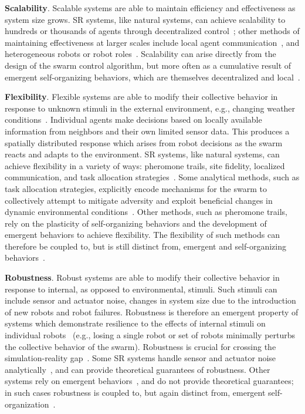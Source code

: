 \textbf{Scalability}. Scalable systems are able to maintain efficiency and
effectiveness as system size grows. SR systems, like natural systems, can
achieve scalability to hundreds or thousands of agents through decentralized
control~\cite{Matthey2009}; other methods of maintaining effectiveness at larger
scales include local agent communication~\cite{Agassounon2001,Lerman2006}, and
heterogeneous robots or robot roles~\cite{Lu2020,Harwell2019a}.  Scalability
can arise directly from the design of the swarm control algorithm, but more
often as a cumulative result of emergent self-organizing behaviors, which
are themselves decentralized and local~\cite{DeWolf2005}.

\textbf{Flexibility}. Flexible systems are able to modify their collective
behavior in response to unknown stimuli in the external environment, e.g.,
changing weather conditions~\cite{Harwell2019a,Just2017,Hunt2020}. Individual
agents make decisions based on locally available information from neighbors and
their own limited sensor data. This produces a spatially distributed response
which arises from robot decisions as the swarm reacts and adapts to the
environment. SR systems, like natural systems, can achieve flexibility in a
variety of ways: pheromone trails, site fidelity, localized communication, and
task allocation strategies~\cite{Just2017,Harwell2019a}. Some analytical methods,
such as task allocation strategies, explicitly encode mechanisms for the swarm
to collectively attempt to mitigate adversity and exploit beneficial changes in
dynamic environmental conditions~\cite{Just2017,Winfield2008}. Other methods,
such as pheromone trails, rely on the plasticity of self-organizing behaviors
and the development of emergent behaviors to achieve flexibility. The
flexibility of such methods can therefore be coupled to, but is still distinct
from, emergent and self-organizing behaviors~\cite{DeWolf2005}.

\textbf{Robustness}. Robust systems are able to modify their collective behavior
in response to internal, as opposed to environmental, stimuli.  Such stimuli can
include sensor and actuator noise, changes in system size due to the
introduction of new robots and robot failures.  Robustness is therefore an
emergent property of systems which demonstrate resilience to the effects of
internal stimuli on individual robots~\cite{DeWolf2005} (e.g., losing a single
robot or set of robots minimally perturbs the collective behavior of the swarm).
Robustness is crucial for crossing the simulation-reality
gap~\cite{Hecker2015,Francesca2014}.  Some SR systems handle sensor and
actuator noise
analytically~\cite{Dallalibera2011,Claudi2014,Zong2006,Nurzaman2009,Turgut2008},
and can provide theoretical guarantees of robustness.  Other systems rely on
emergent behaviors~\cite{Harwell2020a}, and do not provide theoretical
guarantees; in such cases robustness is coupled to, but again distinct from,
emergent self-organization~\cite{Hunt2020,DeWolf2005}.

